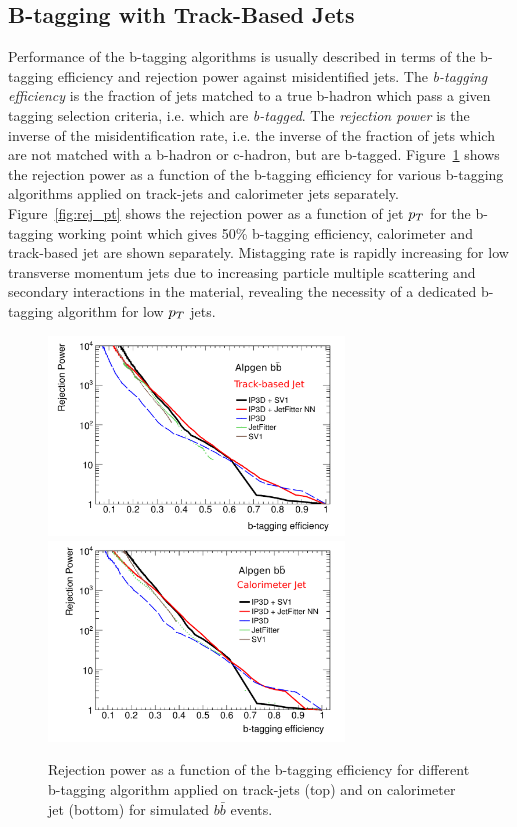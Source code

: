 \subsection{B-tagging with Track-Based Jets}
Performance of the b-tagging algorithms is usually described in terms of the b-tagging
efficiency and rejection power against misidentified jets. The \emph{b-tagging efficiency} is the fraction of jets
matched to a true b-hadron which pass a given tagging selection criteria, i.e. which are \emph{b-tagged}.
The \emph{rejection power} is the inverse of the misidentification rate, i.e. the inverse of the fraction 
of jets which are not matched with a b-hadron or c-hadron, but are b-tagged. 
Figure~\ref{fig:eff_rej} shows the rejection power as a function of the b-tagging efficiency for various b-tagging 
algorithms applied on track-jets and calorimeter jets separately. Figure~\ref{fig:rej_pt}  shows the rejection power as a function of jet $p_{T}$ for the
b-tagging working point  which gives 50\% b-tagging efficiency, calorimeter and track-based jet are shown separately. Mistagging rate is rapidly increasing
for low transverse momentum jets due to increasing particle multiple scattering and secondary interactions in the material,
revealing the necessity of a dedicated b-tagging algorithm for low $p_{T}$ jets.

\begin{figure}[!tp]
\centering
\includegraphics[width=0.7\textwidth]{figure/trackjet/std_eff_rej2.pdf}
\includegraphics[width=0.7\textwidth]{figure/trackjet/std_cal_eff_rej2.pdf}
\caption{Rejection power as a function of the b-tagging efficiency for different b-tagging algorithm applied
	 on track-jets (top) and on calorimeter jet (bottom) for simulated $b\bar{b}$ events.}
\label{fig:eff_rej}
\end{figure}    

